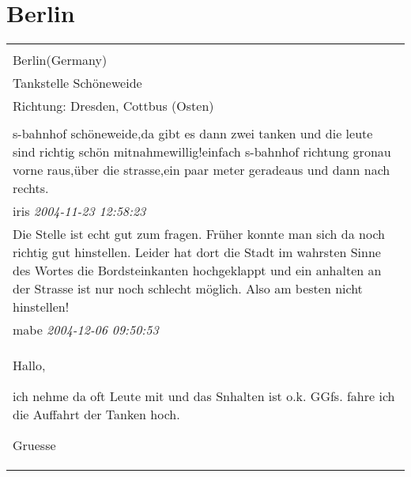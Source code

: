 \documentclass[a4paper,12pt]{article}
\begin{document}
\section{Berlin}
\begin{tabular}{|p{13cm}|}
\hline\\
Berlin(Germany)\\
Tankstelle Schöneweide\\
Richtung: Dresden, Cottbus (Osten) \\
\hline\\
s-bahnhof schöneweide,da gibt es dann zwei tanken und die leute sind richtig schön mitnahmewillig!einfach s-bahnhof richtung gronau vorne raus,über die strasse,ein paar meter geradeaus und dann nach rechts. \\
iris \textit{ 2004-11-23 12:58:23 }\\\hline Die Stelle ist echt gut zum fragen. Früher konnte man sich da noch richtig gut hinstellen. Leider hat dort die Stadt im wahrsten Sinne des Wortes die Bordsteinkanten hochgeklappt und ein anhalten an der Strasse ist nur noch schlecht möglich. Also am besten nicht hinstellen! \\
mabe \textit{ 2004-12-06 09:50:53 }\\\hline Hallo,

ich nehme da oft Leute mit und das Snhalten ist o.k.
GGfs. fahre ich die Auffahrt der Tanken hoch.

Gruesse


\end{tabular}
\end{document}
